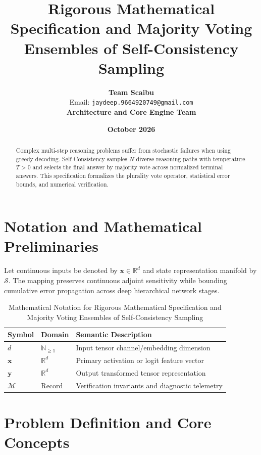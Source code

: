 \documentclass[11pt,a4paper]{article}
\title{\textbf{Rigorous Mathematical Specification and Majority Voting Ensembles of Self-Consistency Sampling}}
\author{\textbf{Team Scaibu} \\ \small Email: \texttt{jaydeep.9664920749@gmail.com} \\ \small \textbf{Architecture and Core Engine Team}}
\date{\textbf{October 2026}}
\theoremstyle{definition}
\begin{document}
\maketitle

\begin{abstract}
Complex multi-step reasoning problems suffer from stochastic failures when using greedy decoding. Self-Consistency samples $N$ diverse reasoning paths with temperature $T > 0$ and selects the final answer by majority vote across normalized terminal answers. This specification formalizes the plurality vote operator, statistical error bounds, and numerical verification.
\end{abstract}

\section{Notation and Mathematical Preliminaries}

Let continuous inputs be denoted by $\mathbf{x} \in \mathbb{R}^d$ and state representation manifold by $\mathcal{S}$. The mapping preserves continuous adjoint sensitivity while bounding cumulative error propagation across deep hierarchical network stages.

\begin{table}[h]
\centering
\caption{Mathematical Notation for Rigorous Mathematical Specification and Majority Voting Ensembles of Self-Consistency Sampling}
\begin{tabular}{lll}
\toprule
\textbf{Symbol} & \textbf{Domain} & \textbf{Semantic Description} \\
\midrule
$d$ & $\mathbb{N}_{\ge 1}$ & Input tensor channel/embedding dimension \\
$\mathbf{x}$ & $\mathbb{R}^d$ & Primary activation or logit feature vector \\
$\mathbf{y}$ & $\mathbb{R}^d$ & Output transformed tensor representation \\
$\mathcal{M}$ & Record & Verification invariants and diagnostic telemetry \\
\bottomrule
\end{tabular}
\end{table}

\section{Problem Definition and Core Concepts}
\end{document}
